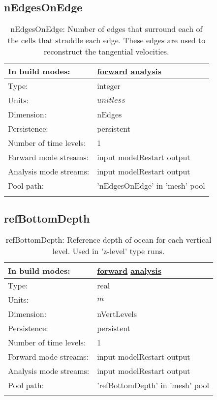 \subsection[nEdgesOnEdge]{nEdgesOnEdge}
\label{subsec:var_sec_mesh_nEdgesOnEdge}
\begin{center}
\begin{longtable}{| p{2.0in} | p{4.0in} |}
        \hline 
        In build modes: & \hyperref[subsec:forward_var_tab_mesh]{forward} \hyperref[subsec:analysis_var_tab_mesh]{analysis} \\
        \hline 
        Type: & integer \\
        \hline 
        Units: & $unitless$ \\
        \hline 
        Dimension: & nEdges \\
        \hline 
        Persistence: & persistent \\
        \hline 
        Number of time levels: & 1 \\
        \hline 
		 Forward mode streams: &  input modelRestart output \\
        \hline 
		 Analysis mode streams: &  input modelRestart output \\
        \hline 
            Pool path: & 'nEdgesOnEdge' in 'mesh' pool
 \\
		 \hline 
    \caption{nEdgesOnEdge: Number of edges that surround each of the cells that straddle each edge. These edges are used to reconstruct the tangential velocities.}
\end{longtable}
\end{center}
\subsection[refBottomDepth]{refBottomDepth}
\label{subsec:var_sec_mesh_refBottomDepth}
\begin{center}
\begin{longtable}{| p{2.0in} | p{4.0in} |}
        \hline 
        In build modes: & \hyperref[subsec:forward_var_tab_mesh]{forward} \hyperref[subsec:analysis_var_tab_mesh]{analysis} \\
        \hline 
        Type: & real \\
        \hline 
        Units: & $m$ \\
        \hline 
        Dimension: & nVertLevels \\
        \hline 
        Persistence: & persistent \\
        \hline 
        Number of time levels: & 1 \\
        \hline 
		 Forward mode streams: &  input modelRestart output \\
        \hline 
		 Analysis mode streams: &  input modelRestart output \\
        \hline 
            Pool path: & 'refBottomDepth' in 'mesh' pool
 \\
		 \hline 
    \caption{refBottomDepth: Reference depth of ocean for each vertical level. Used in 'z-level' type runs.}
\end{longtable}
\end{center}

